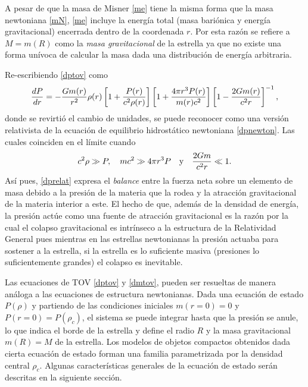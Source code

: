 A pesar de que la masa de Misner \eqref{me} tiene la misma forma que la masa newtoniana \eqref{mN}, \eqref{me} incluye la energía total (masa bariónica y energía gravitacional) encerrada dentro de la coordenada $r$. Por esta razón se refiere a $M=m(R)$ como la \emph{masa gravitacional} de la estrella ya que no existe una forma unívoca de calcular la masa dada una distribución de energía arbitraria. 

Re-escribiendo \eqref{dptov} como
\begin{equation}
    \dv{P}{r} =  - \frac { G  m ( r ) } { r ^ { 2 } } \rho ( r ) \left[ 1 + \frac { P ( r ) } {c ^ { 2 } \rho ( r ) } \right] \left[ 1 + \frac { 4 \pi r ^ { 3 } P ( r ) } { m ( r ) c ^ { 2 } } \right]  \left[ 1 - \frac { 2 G m ( r ) } { c ^ { 2 } r } \right] ^ { - 1 }, 
    \label{dprelat}
\end{equation}
donde se revirtió el cambio de unidades, se puede reconocer como una versión relativista de la ecuación de equilibrio hidrostático newtoniana \eqref{dpnewton}. Las cuales coinciden en el límite cuando 
\begin{equation}
    c^2\rho \gg P \qc mc^2 \gg 4\pi r^3P \quad \text{y} \quad  \frac{2Gm}{c^2r}\ll 1.
\end{equation}
Así pues,  \eqref{dprelat} expresa el \textit{balance} entre la fuerza neta sobre un elemento de masa debido a la presión de la materia que la rodea y la atracción gravitacional de la materia interior a este. El hecho de que, además de la densidad de energía, la presión actúe como una fuente de atracción gravitacional es la razón por la cual el colapso gravitacional es intrínseco a la estructura de la Relatividad General pues mientras en las estrellas newtonianas la presión actuaba para sostener a la estrella, si la estrella es lo suficiente masiva (presiones lo suficientemente grandes) el colapso es inevitable.

Las ecuaciones de TOV \eqref{dptov} y \eqref{dmtov}, pueden ser resueltas de manera análoga a las ecuaciones de estructura newtonianas. Dada una ecuación de estado $P(\rho)$ y partiendo de las condiciones iniciales $m(r=0)=0$ y $P(r=0)=P(\rho_c)$, el sistema se puede integrar hasta que la presión se anule, lo que indica el borde de la estrella y define el radio $R$ y la masa gravitacional $m(R)=M$ de la estrella. Los modelos de objetos compactos obtenidos dada cierta ecuación de estado forman una familia parametrizada por la densidad central $\rho_c$. Algunas características generales de la ecuación de estado serán descritas en la siguiente sección.

